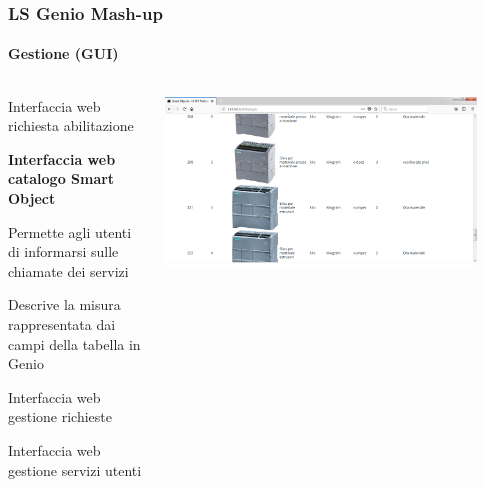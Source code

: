 \documentclass{beamer}
\begin{document}
\begin{frame}[noframenumbering]
\frametitle{LS Genio Mash-up}
\framesubtitle{Gestione (GUI)}
\begin{columns}[T] %
	\begin{column}{.3\textwidth}
		
		\begin{itemize}
			{\tiny
			\item Interfaccia web richiesta abilitazione
			\item \textbf{Interfaccia web catalogo Smart Object}
			
			\begin{itemize}
				{\tiny
				\item Permette agli utenti di informarsi sulle chiamate dei servizi
				\item Descrive la misura rappresentata dai campi della tabella in Genio
				}
			\end{itemize}
			
			\item Interfaccia web gestione richieste
			\item Interfaccia web gestione servizi utenti
			}
		\end{itemize}
	
	\end{column}%
	\hfill%
	\begin{column}{.66\textwidth}
		\includegraphics[width=0.9\textwidth]{images/SmartObjectsPlatform.png}
	\end{column}%
\end{columns}
\end{frame}
\end{document}
